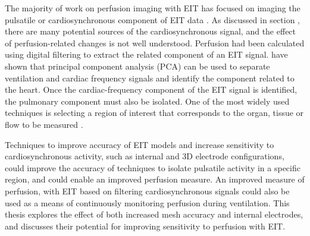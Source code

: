 The majority of work on perfusion imaging with EIT has focused on imaging the pulsatile or 
cardiosynchronous component of EIT data \parencite{nguyen_review_2012}. 
As discussed in section , there are many potential sources of 
the cardiosynchronous signal, and the effect of perfusion-related changes is not well understood. 
Perfusion had been calculated using digital filtering to extract the related component
of an EIT signal. 
 have shown that principal component analysis (PCA) 
can be used to separate ventilation and cardiac frequency signals and identify the component 
related to the heart. Once the cardiac-frequency component of the 
EIT signal is identified, the pulmonary component must also be isolated. 
One of the most widely used techniques 
is selecting a region of interest that corresponds 
to the organ, tissue or flow to be measured
\parencite{braun_accuracy_2018,sola_non-invasive_2011}.

Techniques to improve accuracy of EIT models and increase sensitivity 
to cardiosynchronous activity,
such as internal and 3D electrode configurations, could improve 
the accuracy of techniques to isolate pulsatile
activity in a specific region, and could enable an 
improved perfusion measure. 
An improved measure of perfusion, with EIT based on filtering 
cardiosynchronous signals could also be used as 
a means of continuously monitoring perfusion during ventilation.
This thesis explores the effect of both increased mesh accuracy and internal electrodes,
and discusses their potential for improving sensitivity to perfusion with EIT.
























